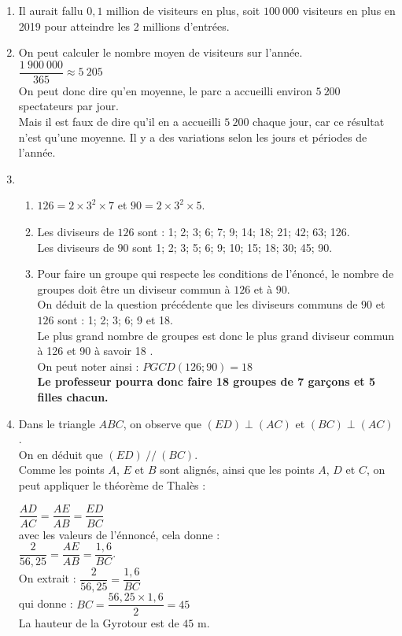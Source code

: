 
\begin{enumerate}[itemsep=1em]
    \item Il aurait fallu $0,1$ million de visiteurs en plus, soit $100~000$  visiteurs en plus en 2019 pour atteindre les 2 millions d'entrées.
    \item On peut calculer le nombre moyen de visiteurs sur l'année. \\
    $\dfrac{1~900~000}{365}\approx 5~205$\\
    On peut donc dire qu'en moyenne, le parc a accueilli environ $5~200$ spectateurs par jour.\\
    Mais il est faux de dire qu'il en a accueilli $5~200$ chaque jour, car ce résultat n'est qu'une moyenne. Il y a des variations selon les jours et périodes de l'année.
    \item \begin{enumerate}[itemsep=1em]
        \item $126=2\times 3^{2}\times7$ et $90=2\times 3^{2}\times5$.
        \item Les diviseurs de $126$ sont : 1; 2; 3; 6; 7; 9; 14; 18; 21; 42; 63; 126.\\ Les diviseurs de $90$ sont 1; 2; 3; 5; 6; 9; 10; 15; 18; 30; 45; 90.
        \item Pour faire un groupe qui respecte les conditions de l'énoncé, le nombre de groupes doit être un diviseur commun à $126$ et à $90$.\\
        On déduit de la question précédente que les diviseurs communs de $90$ et $126$ sont : 1; 2; 3; 6; 9 et 18.\\
        Le plus grand nombre de groupes est donc le plus grand diviseur commun à 126 et 90 à savoir 18  .\\
        On peut noter ainsi : $PGCD(126;90)=18$\\
        \textbf{Le professeur pourra donc faire 18 groupes de 7 garçons et 5 filles chacun.}
    \end{enumerate}
    \item Dans le triangle $ABC$, on observe que $(ED)\perp (AC)$ et $(BC)\perp (AC)$.\\ On en déduit que $(ED)\ //\ (BC)$.\\
    Comme les points $A$, $E$ et $B$ sont alignés, ainsi que les points $A$, $ D$ et $C$, on peut appliquer le théorème de Thalès :
    
    \medskip
        $\dfrac{AD}{AC}=\dfrac{AE}{AB}=\dfrac{ED}{BC}$\\
            \medskip
    avec les valeurs de l'énnoncé, cela donne :\\
      $\dfrac{2}{56,25}=\dfrac{AE}{AB}=\dfrac{1,6}{BC}$.\\
          \medskip
    On extrait :   $\dfrac{2}{56,25}=\dfrac{1,6}{BC}$\\ qui donne : $BC=\dfrac{56,25\times 1,6}{2}=45$\\
        \medskip
    La hauteur de la Gyrotour est de $45$ m.
\end{enumerate}

\medskip 

